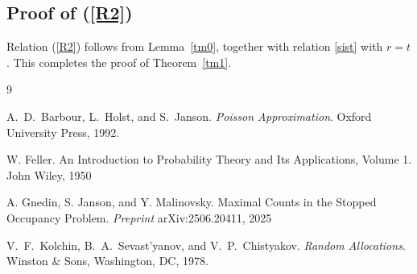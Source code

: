\documentclass[12]{article}
\begin{document}
\subsection*{Proof of (\ref{R2})}

Relation (\ref{R2})  follows from Lemma~\ref{tm0}, together with relation \eqref{sist} with $r=t$. This completes the proof of Theorem~\ref{tm1}.


\begin{thebibliography}{9}

A.~D.~Barbour, L.~Holst, and S.~Janson.
\newblock \emph{Poisson Approximation}.
\newblock Oxford University Press, 1992.


W. Feller.
\newblock An Introduction to Probability Theory and Its Applications, Volume 1.
 \newblock John Wiley, 1950

A. Gnedin, S. Janson, and Y. Malinovsky.
\newblock Maximal Counts in the Stopped Occupancy Problem.
 \newblock \emph{Preprint}	arXiv:2506.20411, 2025


V.~F.~Kolchin, B.~A.~Sevast'yanov, and V.~P.~Chistyakov.
\newblock \emph{Random Allocations}.
\newblock Winston \& Sons, Washington, DC, 1978.


\end{thebibliography}
\end{document}
